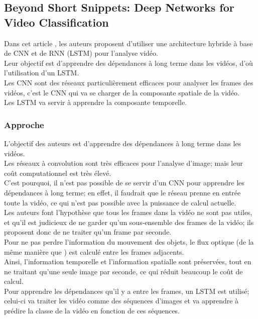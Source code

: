 \documentclass[11pt]{article}
\begin{document}
\subsection{Beyond Short Snippets: Deep Networks for Video Classification}
\label{sec:org667d1a3}
Dans cet article \cite{Joe_Yue_Hei_Ng_2015}, les auteurs proposent d'utiliser une architecture hybride à base de CNN et de RNN (LSTM) pour l'analyse vidéo.\\
Leur objectif est d'apprendre des dépendances à long terme dans les vidéos, d'où l'utilisation d'un LSTM.\\
Les CNN sont des réseaux particulièrement efficaces pour analyser les frames des vidéos, c'est le CNN qui va se charger de la composante spatiale de la vidéo.\\
Les LSTM va servir à apprendre la composante temporelle.\\

\subsubsection{Approche}
\label{sec:orga89029d}
L'objectif des auteurs est d'apprendre des dépendances à long terme dans les vidéos.\\
Les réseaux à convolution sont très efficaces pour l'analyse d'image; mais leur coût computationnel est très élevé.\\
C'est pourquoi, il n'est pas possible de se servir d'un CNN pour apprendre les dépendances à long terme; en effet, il faudrait que le réseau prenne en entrée toute la vidéo, ce qui n'est pas possible avec la puissance de calcul actuelle.\\
Les auteurs font l'hypothèse que tous les frames dans la vidéo ne sont pas utiles, et qu'il est judicieux de ne garder qu'un sous-ensemble des frames de la vidéo; ils proposent donc de ne traiter qu'un frame par seconde.\\
Pour ne pas perdre l'information du mouvement des objets, le flux optique (de la même manière que \cite{DBLP:journals/corr/SimonyanZ14}) est calculé entre les frames adjacents.\\
Ainsi, l'information temporelle et l'information spatialle sont préservées, tout en ne traitant qu'une seule image par seconde, ce qui réduit beaucoup le coût de calcul.\\
Pour apprendre les dépendances qu'il y a entre les frames, un LSTM est utilisé; celui-ci va traiter les vidéo comme des séquences d'images et va apprendre à prédire la classe de la vidéo en fonction de ces séquences.\\
\end{document}
